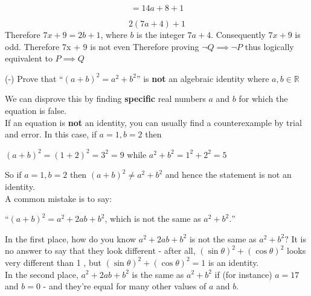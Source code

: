 \documentclass{exam}
\begin{document}
\begin{questions}
\begin{solution}
\begin{equation}
  = 14a + 8 + 1  
\end{equation}

\begin{equation}
     2(7a + 4) + 1
\end{equation}
Therefore $7x + 9 = 2b + 1$, where $b$ is the integer $7a + 4$.\newline
Consequently $7x + 9$ is odd. \newline
Therefore 7x + 9 is not even \newline
Therefore proving $\neg Q \implies \neg P$ thus logically equivalent to $P \implies Q$
\end{solution}


\question (-) Prove that ``$(a+b)^2 = a^2 +b^2$'' is \textbf{not} an algebraic identity where $a,b \in \mathbb{R}$
  \begin{solution}
  We can disprove this by finding \textbf{specific} real numbers $a$ and $b$ for which the equation is false. \\
  If an equation is \textbf{not} an identity, you can usually find a counterexample by trial and error. In this case, if $a=1,b=2$ then
  \begin{center}
      $(a+b)^2 = (1+2)^2 = 3^2 = 9$ while $a^2+b^2 = 1^2+2^2 = 5$ 
  \end{center}
  So if $a=1,b=2$ then $(a+b)^2 \neq a^2+b^2$ and hence the statement is not an identity. \vspace{3mm}\\
  A common mistake is to say:
  \begin{center}
``$(a+b)^{2}=a^{2}+2 a b+b^{2}$, which is not the same as $a^{2}+b^{2} .$''
  \end{center}
In the first place, how do you know $a^{2}+2 a b+b^{2}$ is not the same as $a^{2}+b^{2} ?$ It is no answer to say that they look different - after all, $(\sin \theta)^{2}+(\cos \theta)^{2}$ looks very different than 1 , but $(\sin \theta)^{2}+(\cos \theta)^{2}=1$ is an identity. \vspace{3mm}\\
In the second place, $a^{2}+2 a b+b^{2}$ is the same as $a^{2}+b^{2}$ if (for instance) $a=17$ and $b=0$ - and they're equal for many other values of $a$ and $b$.
  \end{solution}



\end{questions}
\end{document}
